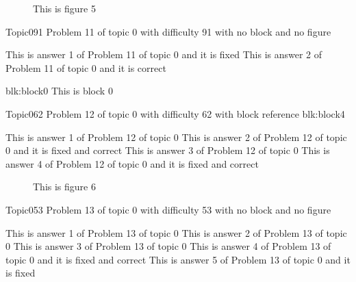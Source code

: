 \documentclass[master]{exam}
\begin{document}
\begin{figure}
	\begin{center}
		This is figure 5 
		\label{fig:figure5}
	\end{center}
\end{figure}

\begin{problem}{Topic0}{91}
	Problem 11 of topic 0 with difficulty 91 with no block and no figure
	\begin{answers}
		\answer[fixed] This is answer 1 of Problem 11 of topic 0 and it is fixed
		\answer[correct] This is answer 2 of Problem 11 of topic 0 and it is correct
	\end{answers}
\end{problem}



\begin{block}{blk:block0}
This is block 0
\end{block}


\begin{problem}[requires=blk:block4]{Topic0}{62}
	Problem 12 of topic 0 with difficulty 62 with block reference blk:block4
	\begin{answers}
		\answer This is answer 1 of Problem 12 of topic 0 
		 This is answer 2 of Problem 12 of topic 0 and it is fixed and correct
		\answer This is answer 3 of Problem 12 of topic 0 
		 This is answer 4 of Problem 12 of topic 0 and it is fixed and correct
	\end{answers}
\end{problem}



\begin{figure}
	\begin{center}
		This is figure 6 
		\label{fig:figure6}
	\end{center}
\end{figure}

\begin{problem}{Topic0}{53}
	Problem 13 of topic 0 with difficulty 53 with no block and no figure
	\begin{answers}
		\answer This is answer 1 of Problem 13 of topic 0 
		\answer This is answer 2 of Problem 13 of topic 0 
		\answer This is answer 3 of Problem 13 of topic 0 
		 This is answer 4 of Problem 13 of topic 0 and it is fixed and correct
		\answer[fixed] This is answer 5 of Problem 13 of topic 0 and it is fixed
	\end{answers}
\end{problem}
\end{document}
